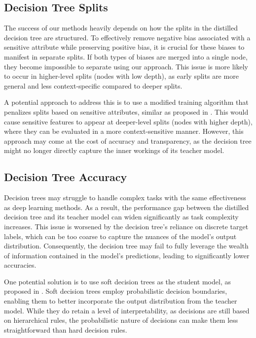 \subsection*{Decision Tree Splits}
The success of our methods heavily depends on how the splits in the distilled decision tree are structured.  
To effectively remove negative bias associated with a sensitive attribute while preserving positive bias,  
it is crucial for these biases to manifest in separate splits.  
If both types of biases are merged into a single node, they become impossible to separate using our approach.  
This issue is more likely to occur in higher-level splits (nodes with low depth),  
as early splits are more general and less context-specific compared to deeper splits.  

A potential approach to address this is to use a modified training algorithm that penalizes splits based on sensitive attributes,  
similar as proposed in \cite{fairness_decision_tree}.  
This would cause sensitive features to appear at deeper-level splits (nodes with higher depth),
where they can be evaluated in a more context-sensitive manner. 
However, this approach may come at the cost of accuracy and transparency,  
as the decision tree might no longer directly capture the inner workings of its teacher model.

\subsection*{Decision Tree Accuracy}
Decision trees may struggle to handle complex tasks with the same effectiveness as deep learning methods.  
As a result, the performance gap between the distilled decision tree and its teacher model
can widen significantly as task complexity increases.
This issue is worsened by the decision tree's reliance on discrete target labels, 
which can be too coarse to capture the nuances of the model's output distribution.
Consequently, the decision tree may fail to fully leverage the wealth of information contained in the model's predictions,
leading to significantly lower accuracies.

One potential solution is to use soft decision trees as the student model, 
as proposed in \cite{soft_decision_tree}.
Soft decision trees employ probabilistic decision boundaries, 
enabling them to better incorporate the output distribution from the teacher model. 
While they do retain a level of interpretability, as decisions are still based on hierarchical rules,
the probabilistic nature of decisions can make them less straightforward than hard decision rules.


